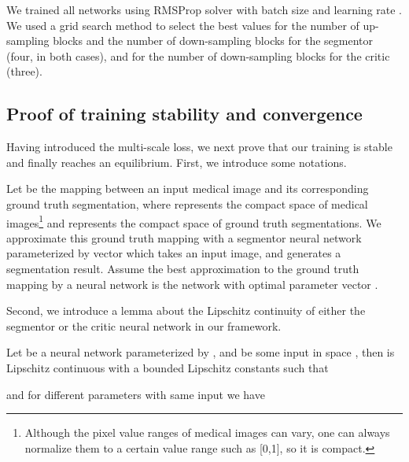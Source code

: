\documentclass[twocolumn]{svjour3}
\begin{document}
We trained all networks using RMSProp solver  with  batch  size  and learning rate . We used a grid search method to select the best values for the number of up-sampling blocks and the number of down-sampling blocks for the segmentor (four, in both cases), and for the number of down-sampling blocks for the critic (three).


\vspace{-25pt}
\subsection{Proof of training stability and convergence}
\vspace{-10pt}
Having introduced the multi-scale  loss, we next prove that our training is stable and finally reaches an equilibrium. First, we introduce some notations.

Let  be the mapping between an input medical image and its corresponding ground truth segmentation, where  represents the compact space of medical images\footnote[1]{Although the pixel value ranges of medical images can vary, one can always normalize them to a certain value range such as [0,1], so it is compact.} and  represents the compact space of ground truth segmentations. We approximate this ground truth mapping  with a segmentor neural network  parameterized by vector  which takes an input image, and generates a segmentation result. Assume the best approximation to the ground truth mapping by a neural network is the network  with optimal parameter vector .

Second, we introduce a lemma about the Lipschitz continuity of either the segmentor or the critic neural network in our framework.
\begin{lemma}\label{lem1}
Let  be a neural network parameterized by , and  be some input in space , then  is Lipschitz continuous with a bounded Lipschitz constants  such that

and for different parameters with same input we have

\end{lemma}
\end{document}
